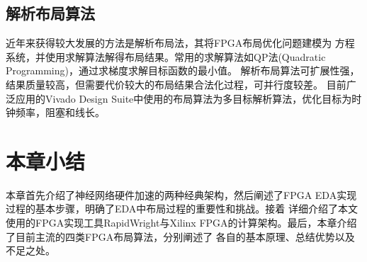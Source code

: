\subsection{解析布局算法}
近年来获得较大发展的方法是解析布局法，其将FPGA布局优化问题建模为
方程系统，并使用求解算法解得布局结果。常用的求解算法如QP法(Quadratic Programming)，通过求梯度求解目标函数的最小值。
解析布局算法可扩展性强，结果质量较高，但需要代价较大的布局结果合法化过程，可并行度较差。
目前广泛应用的Vivado Design Suite中使用的布局算法为多目标解析算法，优化目标为时钟频率，阻塞和线长。



\section{本章小结}

本章首先介绍了神经网络硬件加速的两种经典架构，然后阐述了FPGA EDA实现过程的基本步骤，明确了EDA中布局过程的重要性和挑战。接着
详细介绍了本文使用的FPGA实现工具RapidWright与Xilinx FPGA的计算架构。最后，本章介绍了目前主流的四类FPGA布局算法，分别阐述了
各自的基本原理、总结优势以及不足之处。



































































